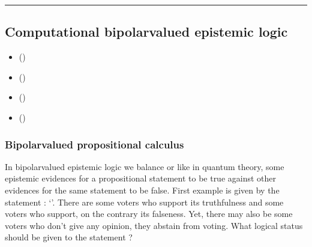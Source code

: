 \documentclass[a4paper,12pt,english]{sphinxhowto}
\begin{document}
\bigskip\hrule\bigskip



\subsection{Computational bipolar\sphinxhyphen{}valued epistemic logic}
\label{\detokenize{pearls:computational-bipolar-valued-epistemic-logic}}\label{\detokenize{pearls:bipolar-valued-sets-tutorial-label}}
\begin{sphinxcontents}
\begin{itemize}
\item {} 
\sphinxAtStartPar
{}\label{\detokenize{pearls:id195}}{\hyperref[\detokenize{pearls:bipolar-valued-propositional-calculus}]{}} ()

\item {} 
\sphinxAtStartPar
{}\label{\detokenize{pearls:id196}}{\hyperref[\detokenize{pearls:superposition-of-elementary-epistemic-situations}]{}} ()

\item {} 
\sphinxAtStartPar
{}\label{\detokenize{pearls:id197}}{\hyperref[\detokenize{pearls:computational-bipolar-valued-set-theory}]{}} ()

\item {} 
\sphinxAtStartPar
{}\label{\detokenize{pearls:id198}}{\hyperref[\detokenize{pearls:the-partially-ordered-commutative-epistemic-fusion-algebra}]{}} ()

\end{itemize}
\end{sphinxcontents}


\subsubsection{Bipolar\sphinxhyphen{}valued propositional calculus}
\label{\detokenize{pearls:bipolar-valued-propositional-calculus}}
\sphinxAtStartPar
In bipolar\sphinxhyphen{}valued epistemic logic we balance or  like in quantum theory, some epistemic evidences for a propositional statement to be true against other evidences for the same statement to be false. First example is given by the statement : ‘’. There are some voters who support its truthfulness and some voters who support, on the contrary its falseness. Yet, there may also be some voters who don’t give any opinion, they abstain from voting. What logical status should be given to the statement  ?
\end{document}
